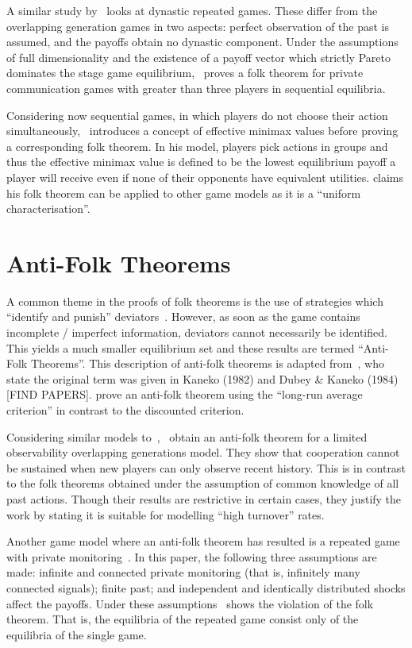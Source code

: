 A similar study by~\cite{Anderlini2008} looks at dynastic repeated games. These
differ from the overlapping generation games in two aspects: perfect observation
of the past is assumed, and the payoffs obtain no dynastic component. Under the
assumptions of full dimensionality and the existence of a payoff vector which
strictly Pareto dominates the stage game equilibrium,~\cite{Anderlini2008}
proves a folk theorem for private communication games with greater than three
players in sequential equilibria.

Considering now sequential games, in which players do not choose their action
simultaneously,~\cite{Wen2002} introduces a concept of effective minimax values
before proving a corresponding folk theorem. In his model, players pick actions
in groups and thus the effective minimax value is defined to be the lowest
equilibrium payoff a player will receive even if none of their opponents have
equivalent utilities. \cite{Wen2002} claims his folk theorem can be applied to
other game models as it is a ``uniform characterisation''.


\section{Anti-Folk Theorems}\label{sec:Anti-Folk_Theorems}
A common theme in the proofs of folk theorems is the use of strategies which
``identify and punish'' deviators~\cite{Masso1989}. However, as soon as the game
contains incomplete / imperfect information, deviators cannot necessarily be
identified. This yields a much smaller equilibrium set and these results are
termed ``Anti-Folk Theorems''. This description of anti-folk theorems is adapted
from~\cite{Masso1989}, who state the original term was given in Kaneko (1982)
and Dubey \& Kaneko (1984) [FIND PAPERS]. \cite{Masso1989} prove an anti-folk
theorem using the ``long-run average criterion'' in contrast to the discounted criterion.

Considering similar models to~\cite{Bhaskar1998, Gossner1996},~\cite{Yoon2001}
obtain an anti-folk theorem for a limited observability overlapping generations
model. They show that cooperation cannot be sustained when new players can only
observe recent history. This is in contrast to the folk theorems obtained under
the assumption of common knowledge of all past actions. Though their results are
restrictive in certain cases, they justify the work by stating it is suitable
for modelling ``high turnover'' rates.

Another game model where an anti-folk theorem has resulted is a repeated game
with private monitoring~\cite{Peski2012}. In this paper, the following three
assumptions are made: infinite and connected private monitoring (that is,
infinitely many connected signals); finite past; and independent and identically
distributed shocks affect the payoffs. Under these assumptions~\cite{Peski2012}
shows the violation of the folk theorem. That is, the equilibria of the repeated
game consist only of the equilibria of the single game.



